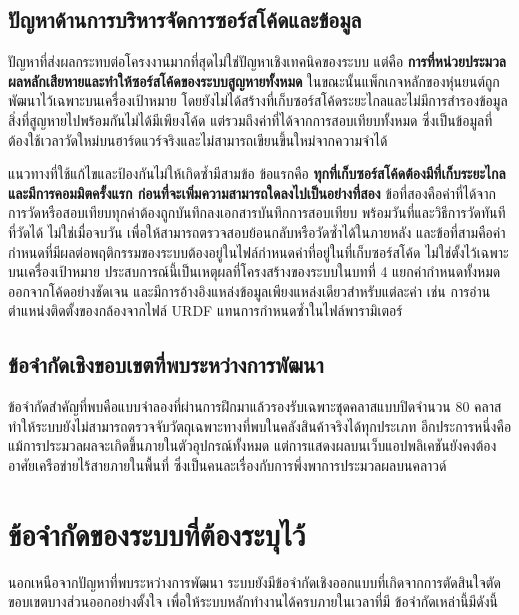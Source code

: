 \documentclass[a4paper,12pt]{report}
\begin{document}
\subsection{ปัญหาด้านการบริหารจัดการซอร์สโค้ดและข้อมูล}

ปัญหาที่ส่งผลกระทบต่อโครงงานมากที่สุดไม่ใช่ปัญหาเชิงเทคนิคของระบบ
แต่คือ \textbf{การที่หน่วยประมวลผลหลักเสียหายและทำให้ซอร์สโค้ดของระบบสูญหายทั้งหมด}
ในขณะนั้นแพ็กเกจหลักของหุ่นยนต์ถูกพัฒนาไว้เฉพาะบนเครื่องเป้าหมาย
โดยยังไม่ได้สร้างที่เก็บซอร์สโค้ดระยะไกลและไม่มีการสำรองข้อมูล
สิ่งที่สูญหายไปพร้อมกันไม่ได้มีเพียงโค้ด แต่รวมถึงค่าที่ได้จากการสอบเทียบทั้งหมด
ซึ่งเป็นข้อมูลที่ต้องใช้เวลาวัดใหม่บนฮาร์ดแวร์จริงและไม่สามารถเขียนขึ้นใหม่จากความจำได้

แนวทางที่ใช้แก้ไขและป้องกันไม่ให้เกิดซ้ำมีสามข้อ
ข้อแรกคือ \textbf{ทุกที่เก็บซอร์สโค้ดต้องมีที่เก็บระยะไกลและมีการคอมมิตครั้งแรก
ก่อนที่จะเพิ่มความสามารถใดลงไปเป็นอย่างที่สอง}
ข้อที่สองคือค่าที่ได้จากการวัดหรือสอบเทียบทุกค่าต้องถูกบันทึกลงเอกสารบันทึกการสอบเทียบ
พร้อมวันที่และวิธีการวัดทันทีที่วัดได้ ไม่ใช่เมื่อจบวัน
เพื่อให้สามารถตรวจสอบย้อนกลับหรือวัดซ้ำได้ในภายหลัง
และข้อที่สามคือค่ากำหนดที่มีผลต่อพฤติกรรมของระบบต้องอยู่ในไฟล์กำหนดค่าที่อยู่ในที่เก็บซอร์สโค้ด
ไม่ใช่ตั้งไว้เฉพาะบนเครื่องเป้าหมาย
ประสบการณ์นี้เป็นเหตุผลที่โครงสร้างของระบบในบทที่ 4 แยกค่ากำหนดทั้งหมด
ออกจากโค้ดอย่างชัดเจน และมีการอ้างอิงแหล่งข้อมูลเพียงแหล่งเดียวสำหรับแต่ละค่า
เช่น การอ่านตำแหน่งติดตั้งของกล้องจากไฟล์ URDF แทนการกำหนดซ้ำในไฟล์พารามิเตอร์

\subsection{ข้อจำกัดเชิงขอบเขตที่พบระหว่างการพัฒนา}

ข้อจำกัดสำคัญที่พบคือแบบจำลองที่ผ่านการฝึกมาแล้วรองรับเฉพาะชุดคลาสแบบปิดจำนวน 80 คลาส
ทำให้ระบบยังไม่สามารถตรวจจับวัตถุเฉพาะทางที่พบในคลังสินค้าจริงได้ทุกประเภท
อีกประการหนึ่งคือแม้การประมวลผลจะเกิดขึ้นภายในตัวอุปกรณ์ทั้งหมด
แต่การแสดงผลบนเว็บแอปพลิเคชันยังคงต้องอาศัยเครือข่ายไร้สายภายในพื้นที่
ซึ่งเป็นคนละเรื่องกับการพึ่งพาการประมวลผลบนคลาวด์

\section{ข้อจำกัดของระบบที่ต้องระบุไว้}

นอกเหนือจากปัญหาที่พบระหว่างการพัฒนา
ระบบยังมีข้อจำกัดเชิงออกแบบที่เกิดจากการตัดสินใจตัดขอบเขตบางส่วนออกอย่างตั้งใจ
เพื่อให้ระบบหลักทำงานได้ครบภายในเวลาที่มี ข้อจำกัดเหล่านี้มีดังนี้
\end{document}
